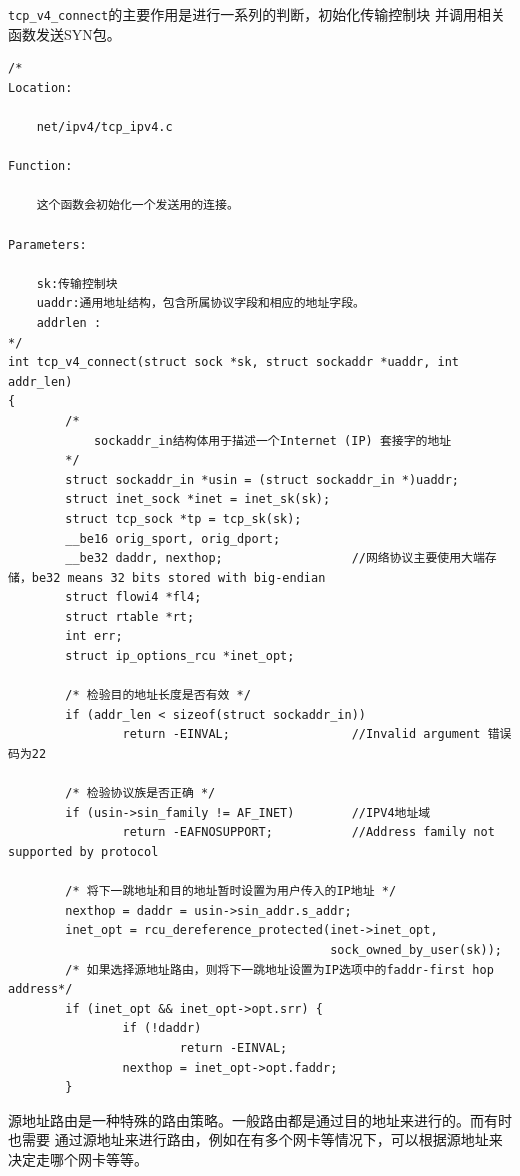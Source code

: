             \texttt{tcp_v4_connect}的主要作用是进行一系列的判断，初始化传输控制块
            并调用相关函数发送SYN包。
\begin{verbatim}
/*
Location:

    net/ipv4/tcp_ipv4.c

Function:

    这个函数会初始化一个发送用的连接。

Parameters:

    sk:传输控制块
    uaddr:通用地址结构，包含所属协议字段和相应的地址字段。
    addrlen :
*/
int tcp_v4_connect(struct sock *sk, struct sockaddr *uaddr, int addr_len)
{
        /*
            sockaddr_in结构体用于描述一个Internet (IP) 套接字的地址     
        */
        struct sockaddr_in *usin = (struct sockaddr_in *)uaddr; 
        struct inet_sock *inet = inet_sk(sk);
        struct tcp_sock *tp = tcp_sk(sk);
        __be16 orig_sport, orig_dport;
        __be32 daddr, nexthop;                  //网络协议主要使用大端存储，be32 means 32 bits stored with big-endian
        struct flowi4 *fl4;
        struct rtable *rt;
        int err;
        struct ip_options_rcu *inet_opt;

        /* 检验目的地址长度是否有效 */
        if (addr_len < sizeof(struct sockaddr_in))
                return -EINVAL;                 //Invalid argument 错误码为22

        /* 检验协议族是否正确 */
        if (usin->sin_family != AF_INET)        //IPV4地址域
                return -EAFNOSUPPORT;           //Address family not supported by protocol

        /* 将下一跳地址和目的地址暂时设置为用户传入的IP地址 */
        nexthop = daddr = usin->sin_addr.s_addr;
        inet_opt = rcu_dereference_protected(inet->inet_opt,
                                             sock_owned_by_user(sk));
        /* 如果选择源地址路由，则将下一跳地址设置为IP选项中的faddr-first hop address*/
        if (inet_opt && inet_opt->opt.srr) {
                if (!daddr)
                        return -EINVAL;
                nexthop = inet_opt->opt.faddr;
        }
\end{verbatim}
            源地址路由是一种特殊的路由策略。一般路由都是通过目的地址来进行的。而有时也需要
            通过源地址来进行路由，例如在有多个网卡等情况下，可以根据源地址来决定走哪个网卡等等。

